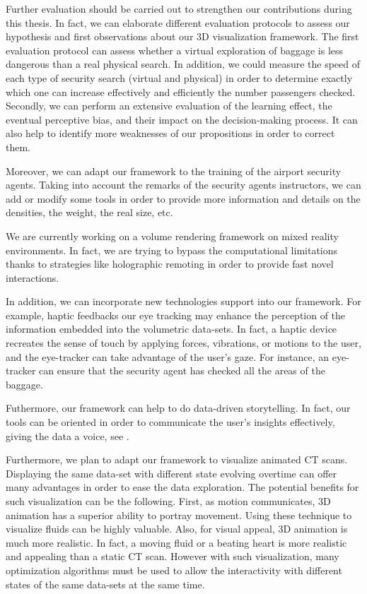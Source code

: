 Further evaluation should be carried out to strengthen our contributions during this thesis. In fact, we can elaborate different evaluation protocols to assess our hypothesis and first observations about our 3D visualization framework. The first evaluation protocol can assess whether a virtual exploration of baggage is less dangerous than a real physical search. In addition, we could measure the speed of each type of security search (virtual and physical) in order to determine exactly which one can increase effectively and efficiently the number passengers checked. Secondly, we can perform an extensive evaluation of the learning effect, the eventual perceptive bias, and their impact on the decision-making process.  It can also help to identify more weaknesses of our propositions in order to correct them. 

Moreover, we can adapt our framework to the training of the airport security agents. Taking into account the remarks of the security agents instructors, we can add or modify some tools in order to provide more information and details on the densities, the weight, the real size, etc.  


We are currently working on a  volume rendering framework on mixed reality environments.  In fact, we are trying to bypass the computational limitations thanks to strategies like holographic remoting in order to provide fast novel interactions. 


In addition,  we can incorporate new technologies support into our framework. For example, haptic feedbacks our eye tracking may enhance the perception of the information embedded into the volumetric data-sets. In fact, a haptic device recreates the sense of touch by applying forces, vibrations, or motions to the user, and the eye-tracker can take advantage of the user's gaze. For instance, an eye-tracker can ensure that the security agent has checked all the areas of the baggage. 


Futhermore, our framework can help to do data-driven storytelling. In fact, our tools can be oriented in order to communicate the user's insights effectively, giving the data a voice, see \cite{storytelling}.

Furthermore, we plan to adapt our framework to visualize animated CT scans. Displaying the same data-set with
 different state evolving overtime can offer many advantages in order to ease the data exploration. The potential
 benefits for such visualization can be the following. First, as motion communicates, 3D animation has a superior 
 ability to portray movement. Using these technique to visualize fluids can be highly valuable. Also, for visual
 appeal, 3D animation is much more realistic. In fact, a moving fluid or a beating heart is more realistic and
 appealing than a static CT scan. However with such visualization, many optimization algorithms must be used to
     allow the interactivity with different states of the same data-sets at the same time.
     

     